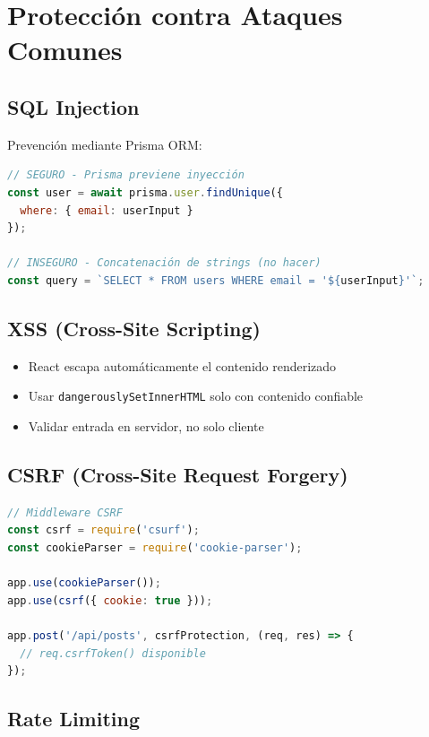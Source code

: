 \documentclass[a4paper]{report}
\begin{document}
\section{Protección contra Ataques Comunes}

\subsection{SQL Injection}

Prevención mediante Prisma ORM:

\begin{lstlisting}[language=JavaScript]
// SEGURO - Prisma previene inyección
const user = await prisma.user.findUnique({
  where: { email: userInput }
});

// INSEGURO - Concatenación de strings (no hacer)
const query = `SELECT * FROM users WHERE email = '${userInput}'`;
\end{lstlisting}

\subsection{XSS (Cross-Site Scripting)}

\begin{itemize}
  \item React escapa automáticamente el contenido renderizado
  \item Usar \texttt{dangerouslySetInnerHTML} solo con contenido confiable
  \item Validar entrada en servidor, no solo cliente
\end{itemize}

\subsection{CSRF (Cross-Site Request Forgery)}

\begin{lstlisting}[language=JavaScript]
// Middleware CSRF
const csrf = require('csurf');
const cookieParser = require('cookie-parser');

app.use(cookieParser());
app.use(csrf({ cookie: true }));

app.post('/api/posts', csrfProtection, (req, res) => {
  // req.csrfToken() disponible
});
\end{lstlisting}

\subsection{Rate Limiting}
\end{document}

